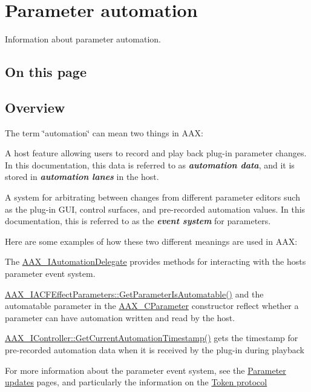 \hypertarget{a00349}{}\section{Parameter automation}
\label{a00349}
Information about parameter automation. 

\hypertarget{a00349_parameterAutomation_contents}{}\subsection{On this page}\label{a00349_parameterAutomation_contents}
 \hypertarget{a00349_parameterAutomation_overview}{}\subsection{Overview}\label{a00349_parameterAutomation_overview}
 The term \char`\"{}automation\char`\"{} can mean two things in A\+A\+X\+: 
\begin{DoxyEnumerate}
\item A host feature allowing users to record and play back plug-\/in parameter changes. In this documentation, this data is referred to as {\itshape {\bfseries automation data}}, and it is stored in {\itshape {\bfseries automation lanes}} in the host.  
\item A system for arbitrating between changes from different parameter editors such as the plug-\/in G\+U\+I, control surfaces, and pre-\/recorded automation values. In this documentation, this is referred to as the {\itshape {\bfseries event system}} for parameters.  
\end{DoxyEnumerate}

 Here are some examples of how these two different meanings are used in A\+A\+X\+: \begin{DoxyItemize}
\item The \hyperlink{a00086}{A\+A\+X\+\_\+\+I\+Automation\+Delegate} provides methods for interacting with the host\textquotesingle{}s parameter event system. \item \hyperlink{a00061_a4e6eeef25a797ea4c6961df45174b169}{A\+A\+X\+\_\+\+I\+A\+C\+F\+Effect\+Parameters\+::\+Get\+Parameter\+Is\+Automatable()} and the {\ttfamily automatable} parameter in the \hyperlink{a00033}{A\+A\+X\+\_\+\+C\+Parameter} constructor reflect whether a parameter can have automation written and read by the host. \item \hyperlink{a00090_af9ab9b228023e116f89249a56c27a20f}{A\+A\+X\+\_\+\+I\+Controller\+::\+Get\+Current\+Automation\+Timestamp()} gets the timestamp for pre-\/recorded automation data when it is received by the plug-\/in during playback\end{DoxyItemize}
For more information about the parameter event system, see the \hyperlink{a00350}{Parameter updates} pages, and particularly the information on the \hyperlink{a00352}{Token protocol} 

